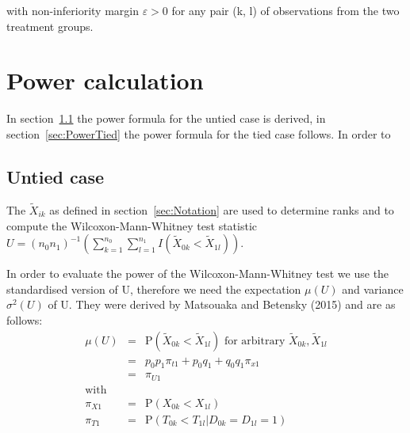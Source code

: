 \documentclass[bimj,fleqn]{w-art}\usepackage[]{graphicx}\usepackage[]{color}
\theoremstyle{plain}
\theoremstyle{definition}
\begin{document}
  with non-inferiority margin $\varepsilon > 0$ for any pair (k, l) of observations
  from the two treatment groups.

  \section{Power calculation}
  \label{sec:Power}
  In section~\ref{sec:PowerUntied} the power formula for the untied case is
  derived, in section~\ref{sec:PowerTied} the power formula for the tied case
  follows. In order to

  \subsection{Untied case}
  \label{sec:PowerUntied}
  The $\widetilde{X}_{ik}$ as defined in section~\ref{sec:Notation} are used to
	determine ranks and to compute the Wilcoxon-Mann-Whitney test statistic
	$ U =(n_0 n_1)^{-1}(\sum_{k=1}^{n_0}
	  \sum_{l=1}^{n_1}I(\widetilde{X}_{0k} < \widetilde{X}_{1l})) $.

	In order to evaluate the power of the Wilcoxon-Mann-Whitney test we use the
  standardised version of U, therefore we need the expectation $\mu(U)$ and
  variance  $\sigma^2(U)$ of U. They were derived by Matsouaka and Betensky
  (2015) and are as follows:
  \begin{eqnarray*}
  \mu(U) & = & \text{P}(\widetilde{X}_{0k} < \widetilde{X}_{1l})  \mbox{ for arbitrary }
                 \widetilde{X}_{0k}, \widetilde{X}_{1l} \\
         & = & p_0 p_1 \pi_{t1} + p_0 q_1 + q_0 q_1 \pi_{x1} \\
         & = & \pi_{U1}\\
  \mbox{with}   &   & \\
  \pi_{X1} & = & \text{P}(X_{0k} < X_{1l}) \\
  \pi_{T1} & = & \text{P}(T_{0k} < T_{1l} | D_{0k} = D_{1l} = 1)
  \end{eqnarray*}
\end{document}
